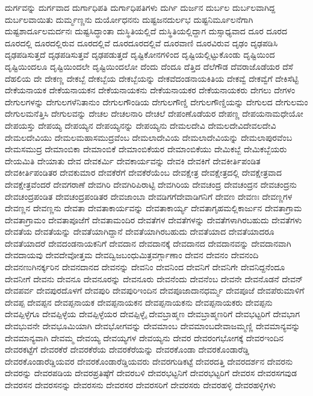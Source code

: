 {ದುರ್ಗವನ್ನು
ದುರ್ಗವಾದ
ದುರ್ಗಾಧಿಪತಿ
ದುರ್ಗಾಧಿಪತಿಗಳು
ದುರ್ಗಿ
ದುರ್ಜನ
ದುರ್ಬಲ
ದುರ್ಬಲವಾಗಿದ್ದ
ದುರ್ಬಲವಾಯಿತು
ದುರ್ಮ್ಮಣ್ಣನು
ದುರ್ಯೋಧನನು
ದುಷ್ಟಜನದುರ್ಲಭ
ದುಷ್ಟನಿರ್ಮೂಲನೆಗಾಗಿ
ದುಷ್ಟಶಾರ್ದೂಲಮರ್ದನಃ
ದುಷ್ಟಸಿದ್ಧಾಂತಾ
ದುಸ್ಥಿತಿಯಲ್ಲಿದೆ
ದುಸ್ಥಿತಿಯಲ್ಲಿದ್ದಾಗ
ದುಸ್ಸಾಧ್ಯವಾದ
ದೂರ
ದೂರದ
ದೂರದಲ್ಲಿ
ದೂರದಲ್ಲಿರುವ
ದೂರದಲ್ಲಿವೆ
ದೂರದೂರದಲ್ಲಿವೆ
ದೂರವಾಣಿ
ದೂರವಿರುವ
ದೃಢಂ
ದೃಢಪಡಿಸಿ
ದೃಢಪಡಿಸುತ್ತದೆ
ದೃಢಪಡಿಸುತ್ತವೆ
ದೃಢಪಡುತ್ತದೆ
ದೃಷ್ಟಿಕೋನಗಳಿಂದ
ದೃಷ್ಟಿಯಲ್ಲಿಟ್ಟುಕೊಂಡು
ದೃಷ್ಟಿಯಿಂದ
ದೃಷ್ಟಿಯಿಂದಲೂ
ದೃಷ್ಟಿಯಿಂದಲೇ
ದೃಷ್ಟಿಯಿಂದಲೋ
ದೆಂದು
ದೆಂದೂ
ದೆತ್ತಿದ
ದೆಲೆಗೌಡ
ದೆವರಾಜೊಡೆಯರ
ದೆಸೆ
ದೆಹಲಿಯ
ದೇ
ದೇಕಣ್ಣ
ದೇಕಬ್ಬೆ
ದೇಕಬ್ಬೆಯ
ದೇಕಬ್ಬೆಯನ್ನು
ದೇಕವೆದಂಡನಾಯಕಿತಿಯ
ದೇಕವ್ವೆ
ದೇಕವ್ವೆಗೆ
ದೇಕಿಸೆಟ್ಟಿ
ದೇಕೆಯನಾಯಕ
ದೇಕೆಯನಾಯಕನ
ದೇಕೆಯನಾಯಕನು
ದೇಕೆಯನಾಯಕರ
ದೇಕೆಯನಾಯಕರು
ದೇಗಲು
ದೇಗಳಂ
ದೇಗುಲಗಳನ್ನು
ದೇಗುಲಗಳೆನಿತಾನುಂ
ದೇಗುಲಗೌಂಡಿಯ
ದೇಗುಲಗೌಣ್ಡಿ
ದೇಗುಲಗೌಣ್ಡಿಯನ್ನು
ದೇಗುಲದ
ದೇಗುಲಮಂ
ದೇಗುಲಮನೆತ್ತಿಸಿ
ದೇಗುಲವನ್ನು
ದೇಚಲ
ದೇಚಲನಾರಿ
ದೇಚಲೆ
ದೇಪಂಣೊಡೆಯರ
ದೇಪಣ್ಣ
ದೇಪಯನಾಮಧೇಯೋ
ದೇಪಯಸ್ತು
ದೇಪಯ್ಯ
ದೇಪಯ್ಯನ
ದೇಪಯ್ಯನನ್ನು
ದೇಪಯ್ಯನು
ದೇಮಲದೇವಿ
ದೇಮಲದೇವಿದೇವಲದೇವಿ
ದೇಮಲದೇವಿಯು
ದೇಮಲಮಹಾಸಮುದ್ರವೆಂಬ
ದೇಮಲಾದೇವಿಯ
ದೇಮಲಾದೇವಿಯನ್ನು
ದೇಮಲಾಪುರವೆಂಬ
ದೇಮಸಮುದ್ರ
ದೇಮಾಂಬಿಕಾ
ದೇಮಾಂಬಿಕೆ
ದೇಮಾಂಬಿಕೆಯರ
ದೇಮಾಂಬಿಕೆಯು
ದೇಮಿಕಬ್ಬೆ
ದೇಮಿಕಬ್ಬೆಯರು
ದೇಯಮಿತಿ
ದೇಯಾತು
ದೇವ
ದೇವಕರ್ಮಿ
ದೇವಕಾರ್ಯವನ್ನು
ದೇವಕಿ
ದೇವಕಿಗೆ
ದೇವಕೀರ್ತಿಪಂಡಿತ
ದೇವಕೀರ್ತಿಪಂಡಿತರ
ದೇವಕುಮಾರ
ದೇವಕೆರೆಗೆ
ದೇವಕೆರೆಯೆಂಬ
ದೇವಕ್ಷೇತ್ರ
ದೇವಕ್ಷೇತ್ರದಲ್ಲಿ
ದೇವಕ್ಷೇತ್ರವಾದ
ದೇವಕ್ಷೇತ್ರವೆಂದರೆ
ದೇವಗರಾಣೆ
ದೇವಗಿರಿ
ದೇವಗಿರಿಪಿರಾಟ್ಟಿ
ದೇವಗಿರಿಯ
ದೇವಚಂದ್ರ
ದೇವಚಂದ್ರನ
ದೇವಚಂದ್ರನು
ದೇವಚಂದ್ರಪಂಡಿತ
ದೇವಚಂದ್ರಪಂಡಿತರ
ದೇವಜಾಂಬಾ
ದೇವಡಿಗಗೆದೇವಾಡಿಗನಿಗೆ
ದೇವಣ
ದೇವಣಃ
ದೇವಣ್ಣಗಳ
ದೇವಣ್ಣನ
ದೇವಣ್ಣನು
ದೇವತಾ
ದೇವತಾಕಾರ್ಯವನ್ನು
ದೇವತಾಕಾರ್ಯ್ಯ
ದೇವತಾಗೃಹಮಲ್ಲಿಕಾರ್ಜುನ
ದೇವತಾಗ್ರಾಮ
ದೇವತಾಗ್ರಾಮಂ
ದೇವತಾಪೂಜೆಗೆ
ದೇವತಾಮಂದಿರ
ದೇವತೆಗಳ
ದೇವತೆಗಳನ್ನು
ದೇವತೆಗಳಾಗಿರಬಹುದು
ದೇವತೆಗಳು
ದೇವತೆಯ
ದೇವತೆಯನ್ನು
ದೇವತೆಯಾಗಿದ್ದಾನೆ
ದೇವತೆಯಾಗಿರಬಹುದು
ದೇವತೆಯಾದ
ದೇವತೆಯಾದರೂ
ದೇವತೆಯಾದರೆ
ದೇವದಂಡನಾಯಕನಿಗೆ
ದೇವದಾನ
ದೇವದಾನಕ್ಕೆ
ದೇವದಾನದ
ದೇವದಾನವನ್ನು
ದೇವದಾನವಾಗಿ
ದೇವದಾಯವು
ದೇವದೇವೋತ್ತಮ
ದೇವದ್ವಿಜಬಂಧುಮಿತ್ರವರ್ಗ್ಗಾಣಾಂ
ದೇವನ
ದೇವನಂ
ದೇವನಂದಿ
ದೇವನಣುಗಿನರ್ಕ್ಕರಿನ
ದೇವನದಾನದ
ದೇವನನ್ನು
ದೇವನಿಂ
ದೇವನಿಂದ
ದೇವನಿಗೆ
ದೇವನಿಗೇ
ದೇವನಿದ್ದನೆಂದೂ
ದೇವನೀಗೆ
ದೇವನು
ದೇವನೂ
ದೇವನೂರನ್ನು
ದೇವನೂರು
ದೇವನೆಂದು
ದೇವನೆಂಬ
ದೇವನೇ
ದೇವನೊಡನೆ
ದೇವನ್
ದೇವಪರ್ವ
ದೇವಪುರದೊಳಗೆ
ದೇವಪುರಿ
ದೇವಪುರಿಇಂದಿನ
ದೇವಪೂಜಾದಾನಧರ್ಮ್ಮ
ದೇವಪೂಜೆ
ದೇವಪೆರುಮಾಳಿಗೆ
ದೇವಪ್ಪ
ದೇವಪ್ಪನ
ದೇವಪ್ಪನಾಯಕ
ದೇವಪ್ಪನಾಯಕನ
ದೇವಪ್ಪನಾಯಕನು
ದೇವಪ್ಪನಾಯಕರು
ದೇವಪ್ಪನು
ದೇವಪ್ಪಿಳ್ಳೆಗೂ
ದೇವಪ್ಪಿಳ್ಳೆಯ
ದೇವಪ್ಪಿಳ್ಳೆಯರ
ದೇವಪ್ಪಿಳ್ಳೈ
ದೇವಬ್ರಾಹ್ಮಣ
ದೇವಬ್ರಾಹ್ಮಣರಿಗೆ
ದೇವಭಟ್ಟರಿಗೆ
ದೇವಭಾಗ
ದೇವಭುವನೇ
ದೇವಭೂಮಿಯಾಗಿ
ದೇವಭೋಗವನ್ನು
ದೇವಮಾಂಬ
ದೇವಮಾಂಬದೇವಾಜಮ್ಮಣ್ಣಿ
ದೇವಮಾನ್ಯವನ್ನು
ದೇವಮಾನ್ಯವಾಗಿ
ದೇವಮ್ಮ
ದೇವಯ್ಯ
ದೇವಯ್ಯಗಳ
ದೇವಯ್ಯನು
ದೇವರ
ದೇವರಂಗಭೋಗಕ್ಕೆ
ದೇವರಇಂದಿನ
ದೇವರಕಟ್ಟೆಗೆ
ದೇವರಕೆರೆ
ದೇವರಕೆರೆಯ
ದೇವರಕೆರೆಯನ್ನು
ದೇವರಕೊಂಡಾ
ದೇವರಕೊಂಡಾರೆಡ್ಡಿ
ದೇವರಕೊಂಡಾರೆಡ್ಡಿಯವರ
ದೇವರಕೊಂಡಾರೆಡ್ಡಿಯವರು
ದೇವರಗುಡಿಕಟ್ಟೆ
ದೇವರದತ್ತಿ
ದೇವರದರ್ಶನ
ದೇವರನು
ದೇವರನ್ನು
ದೇವರಪಡಿಯ
ದೇವರಪ್ರತಿಷ್ಠೆಗೆ
ದೇವರಬಳಿ
ದೇವರಭಟ್ಟನಿಗೆ
ದೇವರಭಟ್ಟರಿಗೆ
ದೇವರಸ
ದೇವರಸಗವುಡ
ದೇವರಸನ
ದೇವರಸನನ್ನು
ದೇವರಸನು
ದೇವರಸರ
ದೇವರಸರಿಗೆ
ದೇವರಸರು
ದೇವರಹಳ್ಳಿ
ದೇವರಹಳ್ಳಿಗಳು
}
